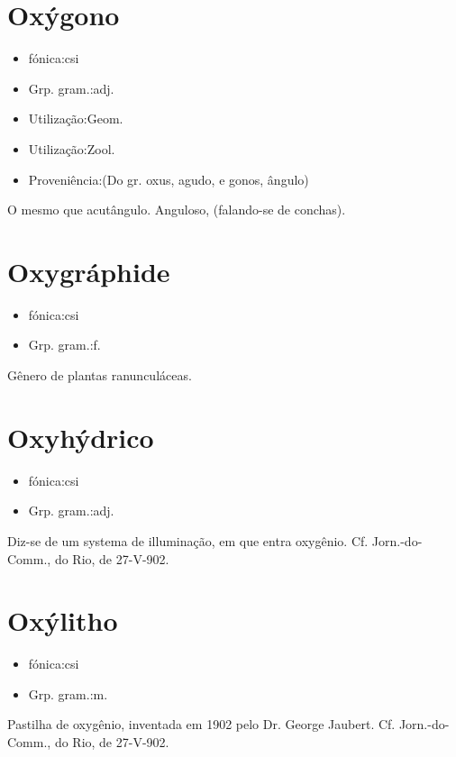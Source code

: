 \section{Oxýgono}
\begin{itemize}
\item {fónica:csi}
\end{itemize}
\begin{itemize}
\item {Grp. gram.:adj.}
\end{itemize}
\begin{itemize}
\item {Utilização:Geom.}
\end{itemize}
\begin{itemize}
\item {Utilização:Zool.}
\end{itemize}
\begin{itemize}
\item {Proveniência:(Do gr. \textunderscore oxus\textunderscore , agudo, e \textunderscore gonos\textunderscore , ângulo)}
\end{itemize}
O mesmo que \textunderscore acutângulo\textunderscore .
Anguloso, (falando-se de conchas).
\section{Oxygráphide}
\begin{itemize}
\item {fónica:csi}
\end{itemize}
\begin{itemize}
\item {Grp. gram.:f.}
\end{itemize}
Gênero de plantas ranunculáceas.
\section{Oxyhýdrico}
\begin{itemize}
\item {fónica:csi}
\end{itemize}
\begin{itemize}
\item {Grp. gram.:adj.}
\end{itemize}
Diz-se de um systema de illuminação, em que entra oxygênio. Cf. \textunderscore Jorn.-do-Comm.\textunderscore , do Rio, de 27-V-902.
\section{Oxýlitho}
\begin{itemize}
\item {fónica:csi}
\end{itemize}
\begin{itemize}
\item {Grp. gram.:m.}
\end{itemize}
Pastilha de oxygênio, inventada em 1902 pelo Dr. George Jaubert. Cf. \textunderscore Jorn.-do-Comm.\textunderscore , do Rio, de 27-V-902.
